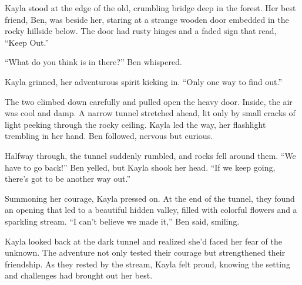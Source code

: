 \documentclass[12pt]{article}
\begin{document}
\begin{tcolorbox}[colframe=black!60, colback=white, 
coltitle=black, colbacktitle=black!15, fonttitle=\bfseries\Large, 
title=Text: The Secret Tunnel, halign title=center, left=10pt, right=10pt, top=10pt, bottom=15pt]


Kayla stood at the edge of the old, crumbling bridge deep in the forest. Her best friend, Ben, was beside her, staring at a strange wooden door embedded in the rocky hillside below. The door had rusty hinges and a faded sign that read, “Keep Out.”

“What do you think is in there?” Ben whispered.

Kayla grinned, her adventurous spirit kicking in. “Only one way to find out.”

The two climbed down carefully and pulled open the heavy door. Inside, the air was cool and damp. A narrow tunnel stretched ahead, lit only by small cracks of light peeking through the rocky ceiling. Kayla led the way, her flashlight trembling in her hand. Ben followed, nervous but curious.

Halfway through, the tunnel suddenly rumbled, and rocks fell around them. “We have to go back!” Ben yelled, but Kayla shook her head. “If we keep going, there’s got to be another way out.”

Summoning her courage, Kayla pressed on. At the end of the tunnel, they found an opening that led to a beautiful hidden valley, filled with colorful flowers and a sparkling stream. “I can’t believe we made it,” Ben said, smiling.

Kayla looked back at the dark tunnel and realized she’d faced her fear of the unknown. The adventure not only tested their courage but strengthened their friendship. As they rested by the stream, Kayla felt proud, knowing the setting and challenges had brought out her best.

\end{tcolorbox}

\vspace{1em}
\end{document}
